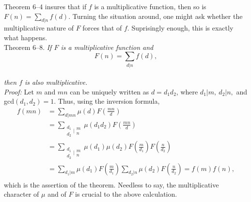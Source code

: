 \documentclass[11pt]{article}
\begin{document}
Theorem 6--4 insures that if $f$ is a multiplicative function, then so is
$F(n)=\sum_{d|n}f(d)$.
Turning the situation around, one might ask whether the multiplicative nature of $F$ forces that of $f$. 
Suprisingly enough, this is exactly what happens.\\[5mm]
{\sc Theorem 6--8.} {\it If $F$ is a multiplicative function and}\\
$$F(n)=\sum_{d|n}f(d),$$\\
{\it then $f$ is also multiplicative.}\\[5mm]
{\itshape Proof:}\: Let $m$ and $mn$ can be uniquely written as $d=d_1d_2$, where $d_1|m,~d_2|n,$ and gcd$(d_1{,} d_2)=1$. Thus, using the inversion formula,\\
\begin{align*}
f(mn)&=\sum_{d|mn}\mu(d)F\left(\frac{mn}d \right)\\
&=\sum_{\begin{matrix} d_1 \\ d_2 \end{matrix}|\begin{matrix} m \\ n \end{matrix}}\mu(d_1d_2)F\left(\frac{mn}d \right)\\
&=\sum_{\begin{matrix} d_1 \\ d_2 \end{matrix}|\begin{matrix} m \\ n \end{matrix}}
\mu(d_1)\mu(d_2)F\left(\frac m{d_1}\right)F\left(\frac n{d_2}\right)\\
&=\sum_{d_1|m}\mu(d_1)F\left(\frac m{d_1}\right)\sum_{d_2|n}\mu(d_2)F\left( \frac n{d_2}\right)=f(m)f(n),\\
\end{align*}
which is the assertion of the theorem. Needless to say, the multiplicative character of $\mu$ and of $F$ is crucial to the above calculation.
\end{document}
